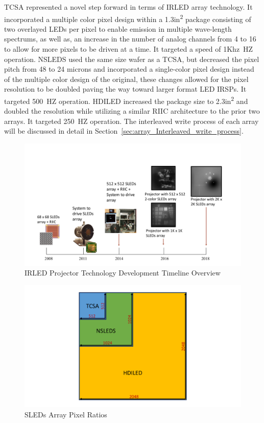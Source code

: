     TCSA represented a novel step forward in terms of IRLED array technology. It incorporated a multiple color pixel design within a 1.3in\textsuperscript{2} package consisting of two overlayed LEDs per pixel to enable emission in multiple wave-length spectrums, as well as, an increase in the number of analog channels from 4 to 16 to allow for more pixels to be driven at a time. It targeted a speed of \mbox{1Khz HZ} operation. NSLEDS used the same size wafer as a TCSA, but decreased the pixel pitch from 48 to 24 microns and incorporated a single-color pixel design instead of the multiple color design of the original, these changes allowed for the pixel resolution to be doubled paving the way toward larger format LED IRSPs. It targeted \mbox{500 HZ} operation. HDILED increased the package size to 2.3in\textsuperscript{2} and doubled the resolution while utilizing a similar RIIC architecture to the prior two arrays. It targeted \mbox{250 HZ} operation. The interleaved write process of each array will be discussed in detail in Section~\ref{sec:array_Interleaved_write_process}.

    \begin{figure}
        \centering
        \includegraphics[trim=0.5in 0.5in 0.5in 1.5in,width=1.0\textwidth]{fig/sleds_timeline.pdf}
        \caption{IRLED Projector Technology Development Timeline Overview}
        \label{fig:sleds_timeline}
    \end{figure}

    \begin{figure}
        \centering
        \includegraphics[trim=0.5in 0.5in 0.5in 1.5in,width=1.0\textwidth]{fig/tcsa_nsleds_hdiled_array_ratio.pdf}
        \caption{SLEDs Array Pixel Ratios}
        \label{fig:tcsa_nsleds_hdiled_array_ratio}
    \end{figure}


